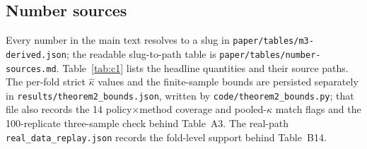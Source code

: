 \subsection{Number sources}\label{app:c3}

Every number in the main text resolves to a slug in
\texttt{paper/tables/m3-derived.json}; the readable slug-to-path table is
\texttt{paper/tables/\allowbreak number-sources.md}. Table~\ref{tab:c1} lists the
headline quantities and their source paths. The per-fold strict
$\hat\kappa$ values and the finite-sample bounds are persisted separately
in \texttt{results/theorem2\_bounds.json}, written by
\texttt{code/theorem2\_bounds.py}; that file also records the 14
policy$\times$method coverage and pooled-$\hat\kappa$ match flags and the
100-replicate three-sample check behind Table~A3. The real-path
\texttt{real\_data\_replay.json} records the fold-level support behind Table~B14.

